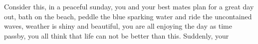 Consider this, in a peaceful sunday, you and your best mates plan for a great day out, bath on the beach, peddle the blue sparking water and ride the uncontained waves, weather is shiny and beautiful, you are all enjoying the day as time passby, you all think that life can not be better than this. Suddenly, your  